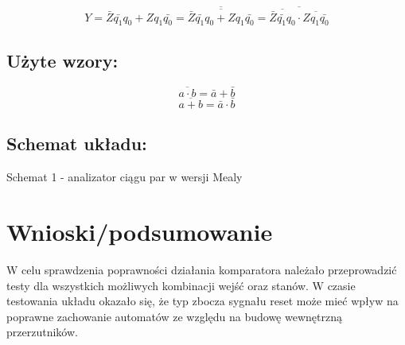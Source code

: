 \documentclass[12pt,a4paper]{article}
\begin{document}
		\vspace{.5cm}
		\begin{displaymath}
			Y = \bar{Z}\bar{q_1}q_0 + Zq_1\bar{q_0}	= \overline{\overline{\bar{Z}\bar{q_1}q_0 + Zq_1\bar{q_0}}}	=\overline{\overline{\bar{Z}\bar{q_1}q_0} \cdot \overline{Zq_1\bar{q_0}}}
		\end{displaymath}
	
		\newpage
		\subsection{Użyte wzory:}
			\begin{equation}
			\overline{a\cdot b}=\bar{a}+\bar{b}
			\end{equation}
			\begin{equation}
			\overline{a+b}=\bar{a}\cdot\bar{b}
			\end{equation}
		
		\subsection{Schemat układu:}
		
		\vspace{1.5cm}
		\begin{center}
			Schemat 1 - analizator ciągu par w wersji Mealy
		\end{center}

	\section{Wnioski/podsumowanie}
	
			W celu sprawdzenia poprawności działania komparatora należało przeprowadzić testy dla wszystkich możliwych kombinacji wejść oraz stanów. W czasie testowania układu okazało się, że typ zbocza sygnału reset może mieć
			wpływ na poprawne zachowanie automatów ze względu na budowę wewnętrzną przerzutników. 
	
\end{document}
